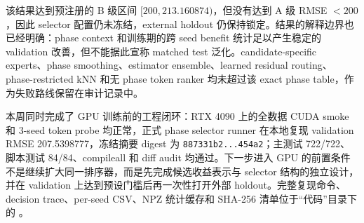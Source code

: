 \documentclass[UTF8,a4paper,11pt]{ctexart}
\newcommand{\code}[1]{\texttt{#1}}
\begin{document}
该结果达到预注册的 B 级区间 $[200,213.160874)$，但没有达到 A 级 RMSE $<200$，因此 selector 配置仍未冻结，external holdout 仍保持锁定。结果的解释边界也已经明确：phase context 和训练期的跨 seed benefit 统计足以产生稳定的 validation 改善，但不能据此宣称 matched test 泛化。candidate-specific experts、phase smoothing、estimator ensemble、learned residual routing、phase-restricted kNN 和无 phase token ranker 均未超过该 exact phase table，作为失败路线保留在审计记录中。

本周同时完成了 GPU 训练前的工程闭环：RTX 4090 上的全数据 CUDA smoke 和 3-seed token probe 均正常，正式 phase selector runner 在本地复现 validation RMSE 207.5398777，冻结摘要 digest 为 \code{887331b2...454a2}；主测试 722/722、脚本测试 84/84、compileall 和 diff audit 均通过。下一步进入 GPU 的前置条件不是继续扩大同一排序器，而是先完成候选收益表示与 selector 结构的独立设计，并在 validation 上达到预设门槛后再一次性打开外部 holdout。完整复现命令、decision trace、per-seed CSV、NPZ 统计缓存和 SHA-256 清单位于“代码”目录下的 。
\end{document}
